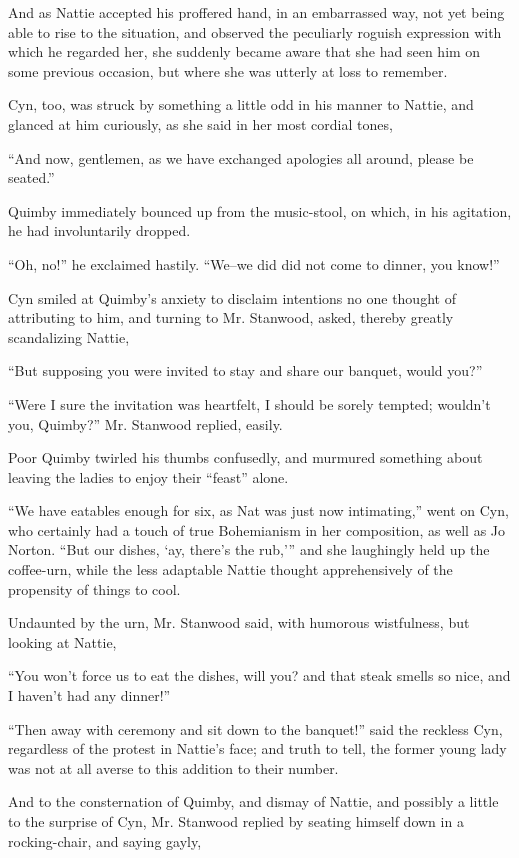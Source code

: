 And as Nattie accepted his proffered hand, in an embarrassed way, not
yet being able to rise to the situation, and observed the peculiarly
roguish expression with which he regarded her, she suddenly became aware
that she had seen him on some previous occasion, but where she was
utterly at loss to remember.

Cyn, too, was struck by something a little odd in his manner to Nattie,
and glanced at him curiously, as she said in her most cordial tones,

``And now, gentlemen, as we have exchanged apologies all around, please
be seated.''

Quimby immediately bounced up from the music-stool, on which, in his
agitation, he had involuntarily dropped.

``Oh, no!'' he exclaimed hastily. ``We--we did did not come to dinner, you
know!''

Cyn smiled at Quimby's anxiety to disclaim intentions no one thought of
attributing to him, and turning to Mr. Stanwood, asked, thereby greatly
scandalizing Nattie,

``But supposing you were invited to stay and share our banquet, would
you?''

``Were I sure the invitation was heartfelt, I should be sorely tempted;
wouldn't you, Quimby?'' Mr. Stanwood replied, easily.

Poor Quimby twirled his thumbs confusedly, and murmured something about
leaving the ladies to enjoy their ``feast'' alone.

``We have eatables enough for six, as Nat was just now intimating,'' went
on Cyn, who certainly had a touch of true Bohemianism in her
composition, as well as Jo Norton. ``But our dishes, `ay, there's the
rub,'{}'' and she laughingly held up the coffee-urn, while the less
adaptable Nattie thought apprehensively of the propensity of things to
cool.

Undaunted by the urn, Mr. Stanwood said, with humorous wistfulness, but
looking at Nattie,

``You won't force us to eat the dishes, will you? and that steak smells
so nice, and I haven't had any dinner!''

``Then away with ceremony and sit down to the banquet!'' said the reckless
Cyn, regardless of the protest in Nattie's face; and truth to tell, the
former young lady was not at all averse to this addition to their
number.

And to the consternation of Quimby, and dismay of Nattie, and possibly a
little to the surprise of Cyn, Mr. Stanwood replied by seating himself
down in a rocking-chair, and saying gayly,

